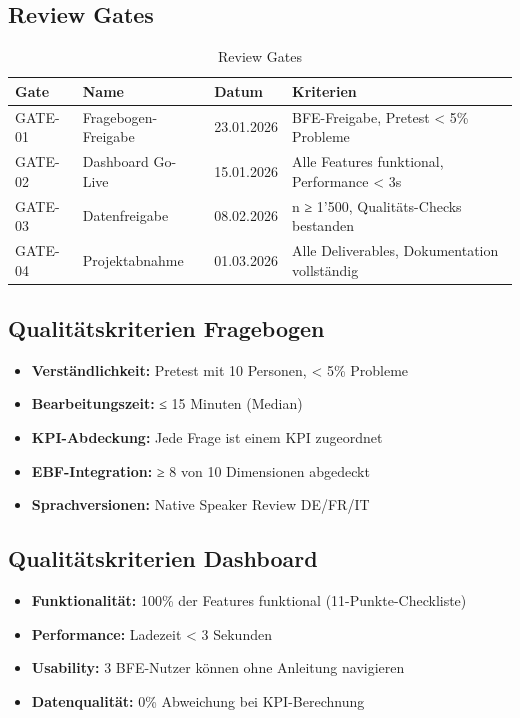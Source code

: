 \documentclass[11pt,a4paper]{article}
\begin{document}
\subsection{Review Gates}

\begin{table}[h]
\centering
{}
\begin{tabular}{C{1.5cm}L{4cm}C{2.5cm}L{5cm}}
\toprule
\textbf{Gate} & \textbf{Name} & \textbf{Datum} & \textbf{Kriterien} \\
\midrule
GATE-01 & Fragebogen-Freigabe & 23.01.2026 & BFE-Freigabe, Pretest < 5\% Probleme \\
GATE-02 & Dashboard Go-Live & 15.01.2026 & Alle Features funktional, Performance < 3s \\
GATE-03 & Datenfreigabe & 08.02.2026 & n ≥ 1'500, Qualitäts-Checks bestanden \\
GATE-04 & Projektabnahme & 01.03.2026 & Alle Deliverables, Dokumentation vollständig \\
\bottomrule
\end{tabular}
\caption{Review Gates}
\end{table}

\subsection{Qualitätskriterien Fragebogen}

\begin{itemize}[leftmargin=*]
    \item \textbf{Verständlichkeit:} Pretest mit 10 Personen, < 5\% Probleme
    \item \textbf{Bearbeitungszeit:} ≤ 15 Minuten (Median)
    \item \textbf{KPI-Abdeckung:} Jede Frage ist einem KPI zugeordnet
    \item \textbf{EBF-Integration:} ≥ 8 von 10 Dimensionen abgedeckt
    \item \textbf{Sprachversionen:} Native Speaker Review DE/FR/IT
\end{itemize}

\subsection{Qualitätskriterien Dashboard}

\begin{itemize}[leftmargin=*]
    \item \textbf{Funktionalität:} 100\% der Features funktional (11-Punkte-Checkliste)
    \item \textbf{Performance:} Ladezeit < 3 Sekunden
    \item \textbf{Usability:} 3 BFE-Nutzer können ohne Anleitung navigieren
    \item \textbf{Datenqualität:} 0\% Abweichung bei KPI-Berechnung
\end{itemize}
\end{document}
